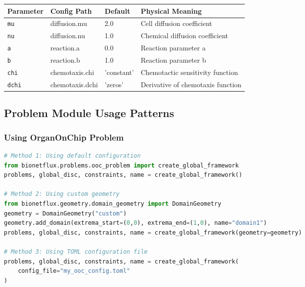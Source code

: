 \begin{longtable}{|p{3cm}|p{2cm}|p{2cm}|p{6cm}|}
\hline
\textbf{Parameter} & \textbf{Config Path} & \textbf{Default} & \textbf{Physical Meaning} \\
\hline
\endhead

\texttt{mu} & diffusion.mu & 2.0 & Cell diffusion coefficient \\
\hline

\texttt{nu} & diffusion.nu & 1.0 & Chemical diffusion coefficient \\
\hline

\texttt{a} & reaction.a & 0.0 & Reaction parameter a \\
\hline

\texttt{b} & reaction.b & 1.0 & Reaction parameter b \\
\hline

\texttt{chi} & chemotaxis.chi & 'constant' & Chemotactic sensitivity function \\
\hline

\texttt{dchi} & chemotaxis.dchi & 'zeros' & Derivative of chemotaxis function \\
\hline

\end{longtable}

\subsection{Problem Module Usage Patterns}
\label{subsec:usage_patterns}

\subsubsection{Using OrganOnChip Problem}

\begin{lstlisting}[language=Python, caption=OoC Problem Usage]
# Method 1: Using default configuration
from bionetflux.problems.ooc_problem import create_global_framework
problems, global_disc, constraints, name = create_global_framework()

# Method 2: Using custom geometry
from bionetflux.geometry.domain_geometry import DomainGeometry
geometry = DomainGeometry("custom")
geometry.add_domain(extrema_start=(0,0), extrema_end=(1,0), name="domain1")
problems, global_disc, constraints, name = create_global_framework(geometry=geometry)

# Method 3: Using TOML configuration file
problems, global_disc, constraints, name = create_global_framework(
    config_file="my_ooc_config.toml"
)
\end{lstlisting}

